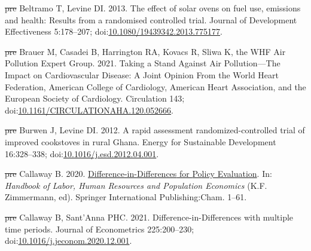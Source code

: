 \documentclass[
  letterpaper,
  DIV=11,
  numbers=noendperiod]{scrartcl}
\newlength{\cslhangindent}
\newenvironment{CSLReferences}[2] %
 {\begin{list}{}{%
  \setlength{\itemindent}{0pt} %
  \setlength{\leftmargin}{0pt} %
  \setlength{\parsep}{0pt} %
  \ifodd #1
   \setlength{\leftmargin}{\cslhangindent} %
   \setlength{\itemindent}{-1\cslhangindent} %
  \fi
  \setlength{\itemsep}{#2\baselineskip}}} %
 {\end{list}} %
\providecommand{\DIFdeltex}[1]{{\protect\color{red}\sout{#1}}}                      %
\providecommand{\DIFaddbegin}{} %
\providecommand{\DIFaddend}{} %
\providecommand{\DIFdelbegin}{} %
\providecommand{\DIFdelend}{} %
\providecommand{\DIFdel}[1]{\texorpdfstring{\DIFdeltex{#1}}{}} %
\newcommand{\DIFscaledelfig}{0.5}
\newlength{\DIFdelgraphicswidth} %
\newlength{\DIFdelgraphicsheight} %
\newcommand{\DIFaddincludegraphics}[2][]{{\color{blue}\fbox{\DIFOincludegraphics[#1]{#2}}}} %
\newcommand{\DIFdelincludegraphics}[2][]{%
\sbox{\DIFdelgraphicsbox}{\DIFOincludegraphics[#1]{#2}}%
\settoboxwidth{\DIFdelgraphicswidth}{\DIFdelgraphicsbox} %
\settoboxtotalheight{\DIFdelgraphicsheight}{\DIFdelgraphicsbox} %
\scalebox{\DIFscaledelfig}{%
\parbox[b]{\DIFdelgraphicswidth}{\usebox{\DIFdelgraphicsbox}\\[-\baselineskip] \rule{\DIFdelgraphicswidth}{0em}}\llap{\resizebox{\DIFdelgraphicswidth}{\DIFdelgraphicsheight}{%
\setlength{\unitlength}{\DIFdelgraphicswidth}%
\begin{picture}(1,1)%
\thicklines\linethickness{2pt} %
{\color[rgb]{1,0,0}\put(0,0){\framebox(1,1){}}}%
{\color[rgb]{1,0,0}\put(0,0){\line( 1,1){1}}}%
{\color[rgb]{1,0,0}\put(0,1){\line(1,-1){1}}}%
\end{picture}%
}\hspace*{3pt}}} %
} %
\DeclareRobustCommand{\DIFaddbegin}{\DIFOaddbegin \let\includegraphics\DIFaddincludegraphics} %
\DeclareRobustCommand{\DIFaddend}{\DIFOaddend \let\includegraphics\DIFOincludegraphics} %
\DeclareRobustCommand{\DIFdelbegin}{\DIFOdelbegin \let\includegraphics\DIFdelincludegraphics} %
\DeclareRobustCommand{\DIFdelend}{\DIFOaddend \let\includegraphics\DIFOincludegraphics} %
\begin{document}
\begin{CSLReferences}{1}{1}
\DIFdelbegin %
\DIFdel{pre}%
\DIFdelend \DIFaddbegin {}
\DIFaddend Beltramo T, Levine DI. 2013. The effect of solar ovens on fuel use,
emissions and health: Results from a randomised controlled trial.
Journal of Development Effectiveness 5:178--207;
doi:\href{https://doi.org/10.1080/19439342.2013.775177}{10.1080/19439342.2013.775177}.

\DIFdelbegin %
\DIFdel{pre}%
\DIFdelend \DIFaddbegin {}
\DIFaddend Brauer M, Casadei B, Harrington RA, Kovacs R, Sliwa K, the WHF Air
Pollution Expert Group. 2021. Taking a {Stand Against Air
Pollution}---{The Impact} on {Cardiovascular Disease}: {A Joint Opinion
From} the {World Heart Federation}, {American College} of {Cardiology},
{American Heart Association}, and the {European Society} of
{Cardiology}. Circulation 143;
doi:\href{https://doi.org/10.1161/CIRCULATIONAHA.120.052666}{10.1161/CIRCULATIONAHA.120.052666}.

\DIFdelbegin %
\DIFdel{pre}%
\DIFdelend \DIFaddbegin {}
\DIFaddend Burwen J, Levine DI. 2012. A rapid assessment randomized-controlled
trial of improved cookstoves in rural {Ghana}. Energy for Sustainable
Development 16:328--338;
doi:\href{https://doi.org/10.1016/j.esd.2012.04.001}{10.1016/j.esd.2012.04.001}.

\DIFdelbegin %
\DIFdel{pre}%
\DIFdelend \DIFaddbegin {}
\DIFaddend Callaway B. 2020.
\href{https://doi.org/10.1007/978-3-319-57365-6_352-1}{Difference-in-{Differences}
for {Policy Evaluation}}. In: \emph{Handbook of {Labor}, {Human
Resources} and {Population Economics}} (K.F. Zimmermann, ed). Springer
International Publishing:Cham. 1--61.

\DIFdelbegin %
\DIFdel{pre}%
\DIFdelend \DIFaddbegin {}
\DIFaddend Callaway B, Sant'Anna PHC. 2021. Difference-in-{Differences} with
multiple time periods. Journal of Econometrics 225:200--230;
doi:\href{https://doi.org/10.1016/j.jeconom.2020.12.001}{10.1016/j.jeconom.2020.12.001}.


\end{CSLReferences}
\end{document}
